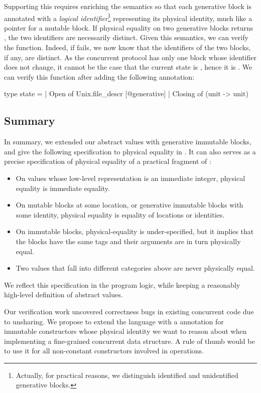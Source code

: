Supporting this requires enriching the \Zoo semantics so that each generative block is annotated with a \emph{logical identifier}\footnote{Actually, for practical reasons, we distinguish identified and unidentified generative blocks.} representing its physical identity, much like a pointer for a mutable block.
If physical equality on two generative blocks returns , the two identifiers are necessarily distinct.
Given this semantics, we can verify the  function.
Indeed, if  fails, we now know that the identifiers of the two blocks, if any, are distinct.
As the concurrent protocol has only one  block whose identifier does not change, it cannot be the case that the current state is , hence it is .
We can verify this function after adding the following annotation:
\begin{ocamlcode}
type state =
  | Open of Unix.file_descr [@generative]
  | Closing of (unit -> unit)
\end{ocamlcode}

\subsection{Summary}

In summary, we extended our abstract values with generative immutable blocks, and give the following specification to physical equality in \ZooLang. It can also serves as a precise specification of physical equality of a practical fragment of \OCaml:

\begin{itemize}
\item On values whose low-level representation is
  an immediate integer, physical equality is immediate equality.
\item On mutable blocks at some location, or generative immutable blocks with some identity, physical equality is equality of locations or identities.
\item On immutable blocks, physical-equality is under-specified, but it implies that the blocks have the same tags and their arguments are in turn physically equal.
\item Two values that fall into different categories above are never physically equal.
\end{itemize}

We reflect this specification in the \Zoo program logic, while keeping a reasonably high-level definition of abstract values.

Our verification work uncovered correctness bugs in existing \OCaml concurrent code due to unsharing. We propose to extend the language with a \ocamlinline{[@generative]} annotation for immutable constructors whose physical identity we want to reason about when implementing a fine-grained concurrent data structure. A rule of thumb would be to use it for all non-constant constructors involved in  operations.

